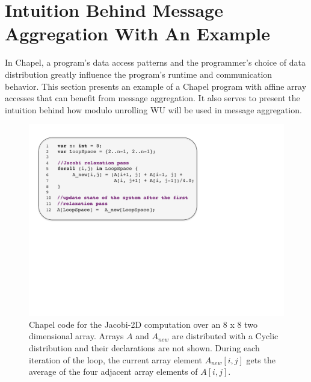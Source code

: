 \section{Intuition Behind Message Aggregation With An Example}\label{sec:motivation_for_aggregation} 

In Chapel, a program's data access patterns and the programmer's choice of data distribution greatly influence the program's runtime and communication behavior. This section presents an example of a Chapel program with affine array accesses that can benefit from message aggregation. It also serves to present the intuition behind how modulo unrolling WU will be used in message aggregation. 

\begin{figure}
\begin{center}
\includegraphics[scale=0.44]{./Figures/jacobi}
\caption{Chapel code for the Jacobi-2D computation over an 8 x 8 two dimensional array. Arrays $A$ and $A_{new}$ are distributed with a Cyclic distribution and their declarations are not shown. During each iteration of the loop, the current array element $A_{new}[i, j]$ gets the average of the four adjacent array elements of $A[i, j]$.}
\label{jacobi_code}
\end{center}
\end{figure}

